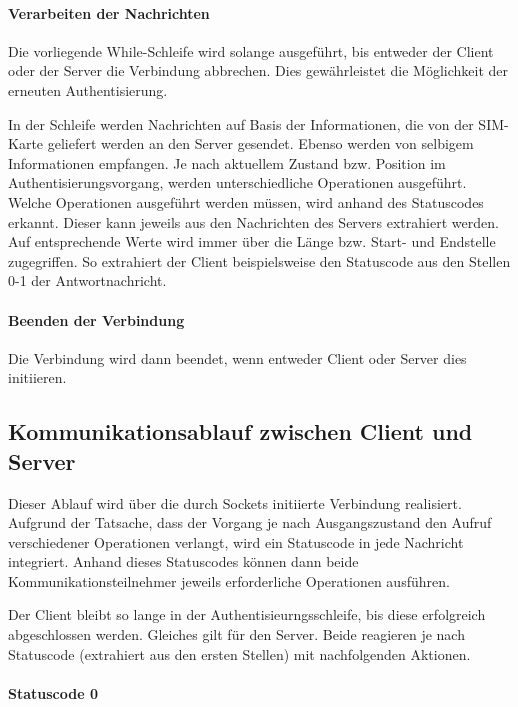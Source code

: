         \paragraph{Verarbeiten der Nachrichten} Die vorliegende While-Schleife wird solange ausgeführt,
        bis entweder der Client oder der Server die Verbindung abbrechen. Dies gewährleistet die
        Möglichkeit der erneuten Authentisierung.

        In der Schleife werden Nachrichten auf Basis der Informationen, die von der SIM-Karte geliefert werden
        an den Server gesendet. Ebenso werden von selbigem Informationen empfangen. Je nach aktuellem Zustand
        bzw. Position im Authentisierungsvorgang, werden unterschiedliche Operationen ausgeführt.
        Welche Operationen ausgeführt werden müssen, wird anhand des Statuscodes erkannt. Dieser kann
        jeweils aus den Nachrichten des Servers extrahiert werden. Auf entsprechende Werte wird immer
        über die Länge bzw. Start- und Endstelle zugegriffen. So extrahiert der Client beispielsweise
        den Statuscode aus den Stellen 0-1 der Antwortnachricht.

        \paragraph{Beenden der Verbindung} Die Verbindung wird dann beendet, wenn entweder Client
        oder Server dies initiieren. 
	
    \subsection{Kommunikationsablauf zwischen Client und Server}
    Dieser Ablauf wird über die durch Sockets initiierte Verbindung realisiert. Aufgrund
    der Tatsache, dass der Vorgang je nach Ausgangszustand den Aufruf verschiedener Operationen
    verlangt, wird ein Statuscode in jede Nachricht integriert. Anhand dieses Statuscodes
    können dann beide Kommunikationsteilnehmer jeweils erforderliche Operationen ausführen.

    Der Client bleibt so lange in der Authentisieurngsschleife, bis diese erfolgreich abgeschlossen werden.
    Gleiches gilt für den Server. Beide reagieren je nach Statuscode (extrahiert aus den ersten Stellen)
    mit nachfolgenden Aktionen.

    \paragraph{Statuscode 0}
